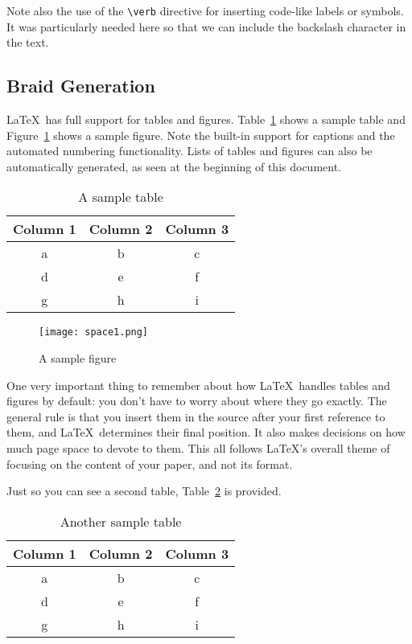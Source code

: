 \documentclass{article}
\begin{document}
Note also the use of the \verb!\verb! directive for inserting code-like labels or symbols.  It was particularly needed here so that we can include the backslash character in the text.

\subsection{Braid Generation}

\LaTeX\ has full support for tables and figures.  Table~\ref{table-sample} shows a sample table and Figure~\ref{figure-sample} shows a sample figure.  Note the built-in support for captions and the automated numbering functionality.  Lists of tables and figures can also be automatically generated, as seen at the beginning of this document.

\begin{table}
\centering
\begin{tabular}{|c|c|c|}\hline
Column 1 & Column 2 & Column 3 \\\hline\hline
a & b & c \\
d & e & f \\
g & h & i \\\hline
\end{tabular}

\caption{A sample table}
\label{table-sample}
\end{table}

\begin{figure}
\centering
\texttt{[image: space1.png]} 

\caption{A sample figure}
\label{figure-sample}
\end{figure}

One very important thing to remember about how \LaTeX\ handles tables and figures by default: you don't have to worry about where they go exactly.  The general rule is that you insert them in the source after your first reference to them, and \LaTeX\ determines their final position.  It also makes decisions on how much page space to devote to them.  This all follows \LaTeX's overall theme of focusing on the content of your paper, and not its format.

Just so you can see a second table, Table~\ref{table-sample2} is provided.

\begin{table}
\centering
\begin{tabular}{|c|c|c|}\hline
Column 1 & Column 2 & Column 3 \\\hline\hline
a & b & c \\
d & e & f \\
g & h & i \\\hline
\end{tabular}

\caption{Another sample table}
\label{table-sample2}
\end{table}
\end{document}
